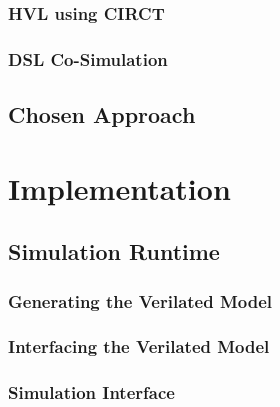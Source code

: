 \documentclass[12pt]{report}
\begin{document}
\subsection{HVL using CIRCT} %

\subsection{DSL Co-Simulation} %

\section{Chosen Approach} %

\chapter{Implementation} %

\section{Simulation Runtime} %

\subsection{Generating the Verilated Model} %

\subsection{Interfacing the Verilated Model} %

\subsection{Simulation Interface} %
\end{document}
